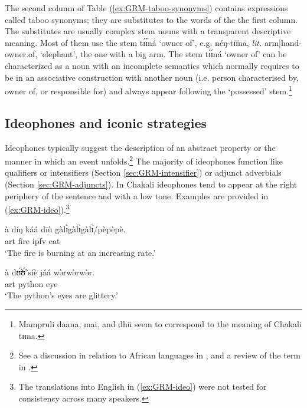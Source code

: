 \begin{exe}
\begin{exe}
\begin{exe}
\begin{exe}
\begin{exe}
\begin{exe}
\begin{exe}
\begin{exe}
\begin{exe}
\begin{exe}
\begin{exe}
\begin{exe}
\begin{table}[!htb]
\begin{tabular}{llll}
\end{tabular}
\end{table}


The second column of  Table (\ref{ex:GRM-taboo-synonyms}) contains expressions called  taboo  synonyms; they are substitutes to the words of the  the first column.  The substitutes  are usually  complex stem nouns with a transparent descriptive meaning. Most of them use the stem {\sls tɪ́ɪ́ná} `owner of', e.g. {\sls néŋ-tɪ̄ɪ̄nā}, {\it lit.} arm|hand-owner.of,  `elephant',  the one with a big arm.  The stem {\sls tɪ́ɪ́ná}  `owner of'  can be characterized as a noun with an incomplete semantics which normally requires to be in an associative construction with another noun (i.e. person characterised by, owner of, or responsible for) and always appear following the `possessed’ stem.\footnote{Mampruli {\sls daana},  {\sls mai}, and   {\sls dhū} seem to correspond to the meaning of Chakali {\sls tɪɪna}.}


\subsection{Ideophones and iconic strategies} 
\label{sec:GRM-onoma}

 Ideophones typically suggest the description of an abstract property or the manner in which an event unfolds.\footnote{See a discussion in relation to African languages in  \citet{sama01}, and a  review of the term in \citet{newm68, voel01, ding11}.}  The majority of ideophones function like  qualifiers or intensifiers (Section \ref{sec:GRM-intensifier}) or adjunct adverbials  (Section \ref{sec:GRM-adjuncts}). In Chakali ideophones tend to appear at the right periphery of the sentence and with a low tone. Examples are provided in (\ref{ex:GRM-ideo}).\footnote{The translations into English in (\ref{ex:GRM-ideo}) were not 
tested for consistency across many speakers.}
          

\ea\label{ex:GRM-ideo}

 \ea\label{ex:GRM-ideo-dxm}
\gll  à díŋ káá dīù gàlɪ̀gàlɪ̀gàlɪ̀/pèpèpè.\\
{\sc art} fire {\sc ipfv} eat  {\ideo}\\
  \glt `The fire is burning at an increasing rate.'


 \ex\label{ex:GRM-ideo-qual}
\gll à dʊ̃́ʊ̃́ síè jáá wə̀rwə̀rwə̀r.\\
{\sc art} python eye {\ident} {\ideo}\\
  \glt `The python's eyes are glittery.'


\end{exe}
\end{exe}
\end{exe}
\end{exe}
\end{exe}
\end{exe}
\end{exe}
\end{exe}
\end{exe}
\end{exe}
\end{exe}
\end{exe}
